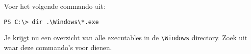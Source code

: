 Voer het volgende commando uit:
\begin{lstlisting}[style=DOS]
PS C:\> dir .\Windows\*.exe
\end{lstlisting}
Je krijgt nu een overzicht van alle executables in de \texttt{\textbackslash Windows} directory. Zoek uit waar deze commando's voor dienen.

